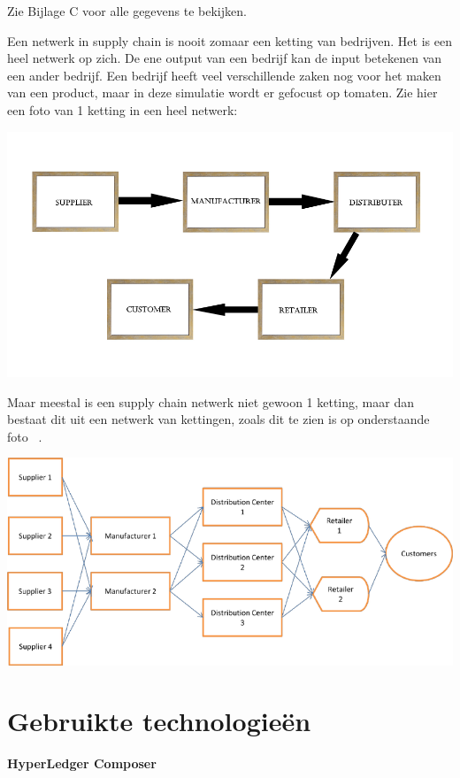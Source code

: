 \documentclass[fleqn,a4paper,12pt]{book}
\begin{document}
Zie Bijlage C voor alle gegevens te bekijken.

Een netwerk in supply chain is nooit zomaar een ketting van bedrijven. Het is een heel netwerk op zich. De ene output van een bedrijf kan de input betekenen van een ander bedrijf. Een bedrijf heeft veel verschillende zaken nog voor het maken van een product, maar in deze simulatie wordt er gefocust op tomaten. Zie hier een foto van 1 ketting in een heel netwerk:

\begin{center}
\includegraphics[width=15cm]{img/ketting}\\[2cm]
\end{center}

Maar meestal is een supply chain netwerk niet gewoon 1 ketting, maar dan bestaat dit uit een netwerk van kettingen, zoals dit te zien is op onderstaande foto ~\autocite{pic1}.

\begin{center}
	\includegraphics[width=15cm]{img/netwerk}\\[3cm]
\end{center}
\section{Gebruikte technologieën}
\textbf{HyperLedger Composer}
\end{document}
